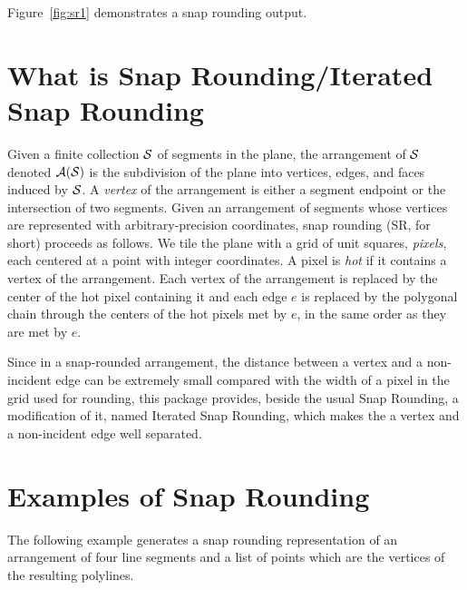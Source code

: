 Figure~\ref{fig:sr1} demonstrates a snap rounding output. 

\section{What is Snap Rounding/Iterated Snap Rounding}
Given a finite collection $\S$ of segments in the plane, the
arrangement of $\S$ denoted $\A(\S)$ is the subdivision of the plane
into vertices, edges, and faces induced by $\S$. %
A {\it vertex\/} of the arrangement is either a segment endpoint or
the intersection of two segments. Given an arrangement of segments
whose vertices are represented with arbitrary-precision coordinates,
snap rounding (SR, for short) proceeds as follows.  We tile the plane
with a grid of unit squares, {\it pixels}, each centered at a point
with integer coordinates. A pixel is {\it hot\/} if it contains a
vertex of the arrangement. Each vertex of the arrangement is replaced
by the center of the hot pixel containing it and each edge $e$ is
replaced by the polygonal chain through the centers of the hot pixels
met by $e$, in the same order as they are met by $e$.

Since in a snap-rounded arrangement, the distance between a vertex and
a non-incident edge can be extremely small compared with the width of a
pixel in the grid used for rounding, this package provides, beside the
usual Snap Rounding, a modification of it, named Iterated Snap Rounding,
which makes the a vertex and a non-incident edge well separated.


\section{Examples of Snap Rounding}

The following example generates a snap rounding representation of an arrangement of four line segments
and a list of points which are the vertices of the resulting polylines.




